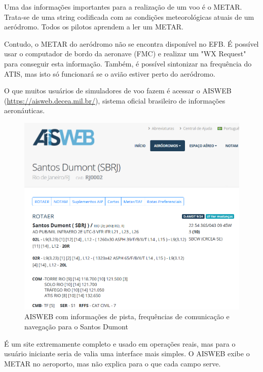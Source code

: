 Uma das informações importantes para a realização de um voo é o METAR. Trata-se 
de uma string codificada com as condições meteorológicas atuais de um aeródromo. 
Todos os pilotos aprendem a ler um METAR.

Contudo, o METAR do aeródromo não se encontra disponível no EFB. É possível usar
 o computador de bordo da aeronave (FMC) e realizar um "WX Request" para conseguir 
 esta informação. Também, é 
 possível sintonizar na frequência do ATIS, mas isto só funcionará se o avião
 estiver perto do aeródromo.

O que muitos usuários de simuladores de voo fazem é acessar o AISWEB 
(\url{https://aisweb.decea.mil.br/}), sistema oficial brasileiro de informações
aeronáuticas. 

\begin{figure}[ht]
    \begin{center}
    \includegraphics[width=350pt]{img/aisweb.png}
    \caption{AISWEB com informações de pista, frequências de comunicação e navegação para o Santos Dumont}
    \label{fig:aisweb}
    \end{center}
\end{figure}

É um site extremamente completo e usado em operações reais, mas para o usuário 
iniciante seria de valia uma interface mais simples. O AISWEB exibe o METAR no 
aeroporto, mas não explica para o que cada campo serve.

